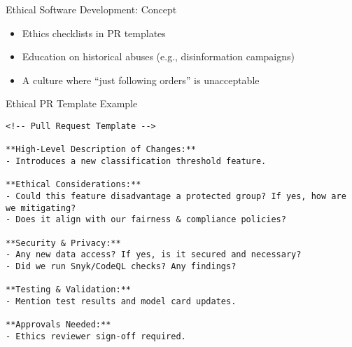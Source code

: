 \documentclass[aspectratio=169]{beamer}
\begin{document}

\begin{frame}{Ethical Software Development: Concept}
\begin{itemize}
\item Ethics checklists in PR templates
\item Education on historical abuses (e.g., disinformation campaigns)
\item A culture where “just following orders” is unacceptable
\end{itemize}
\end{frame}


\begin{frame}[fragile]{Ethical PR Template Example}
\begin{verbatim}
<!-- Pull Request Template -->

**High-Level Description of Changes:**
- Introduces a new classification threshold feature.

**Ethical Considerations:**
- Could this feature disadvantage a protected group? If yes, how are we mitigating?
- Does it align with our fairness & compliance policies?

**Security & Privacy:**
- Any new data access? If yes, is it secured and necessary?
- Did we run Snyk/CodeQL checks? Any findings?

**Testing & Validation:**
- Mention test results and model card updates.

**Approvals Needed:**
- Ethics reviewer sign-off required.
\end{verbatim}
\end{frame}
\end{document}
